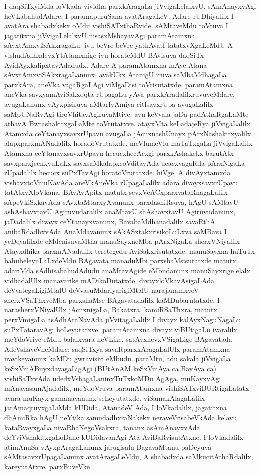 I daqSiTxyiMda loVkada vividha parxkAragaLa jiVvigaLelalxvU, sAmAnayxvAgi heVLa\-bahudAdare, I paramapuruSana avatAragaLeV. Adare rUDhiyalilx I avatAra shabadxkekx oMdu vishiSATxthaRvide. sAMtaveMdu toVruva I jagatitxna jiVvigaLelalxvU nisasxM\-shaya\-vAgi paramAtamxna sAvxtAmxviSAkxragaLu. ivu beVre beVre yathAvatf tatatxvX\-gaLeMdU A vishudAdhxdevxYtAtamxnige ivu horateMdU BAvisuva daqSiTx AvidAyxkalipxta\-vAdadudx. Adare A paramAtamxna mAye Atana sAvxtAmxviSAkxragaLanunx, avakUkx Ata\-nigU iruva saMbaMdhagaLa parxkAra, aneVka vagaRgaLAgi viMgaDisi toVrisutatxde. para\-mAtamxna aneVka savxyamAviSakxqqta rUpagaLu yAva parxkAradalilxruvuveMdare, avu\-gaLanunx vAyxpisiruva aMtarfyAmiya citfsavxrUpa avugaLalilx saMpUNaRvAgi tiroVhita\-vAgiruvaMtive. avu keVvala jaDa padAthaRgaLaMte athavA BwtashakitxgaLaMte toVru\-tatxve. atayxMta keLadajeRya jiVvigaLalilx Atamxda ceYtanayxsavxrUpavu avugaLa jAcnxnashUnayx pArxNashakitxyalilx alapxparxmANadalilx horadoVrutatxde. meVlumeVlu maTaTxgaLa jiVvi\-gaLalilx Atamxna ceYtanayxsavxrUpavu hecucxhecAcxgi parxkAshakekx barutAtx savxparxjecnxyuLaLx savxsaMkalapx\-coVdita\-vAda ucacxvagaRda pArxNigaLa rUpadalilx hecucx suPxTavAgi horatoVrutatxde. hiVge, A divAyxtamxda vishavxtoVmuKavAda aneVkAneVka rUpagaLalilx adara divayxsavxrUpavu tatAtxvX\-loVkana, BAvAvApitx matutx sevxVcACxparxvataRnagaLalilx sApeVkiSxkavAda sAvxtaMtarxyXvanunx parxdashiRsuva, hAgU sAMtavU ashAshavxtavU Agiruvudaralilx anaMtavU shAshavxtavU Agiruvudanunx, jaDadalilx divayx ceYtanayxvanunx, BavabaMdhanadalilx savaRthA anibaRdadhxvAda AnaMdavanunx sAkASxtakxrisikoLuLxva saMBava I yeDeyalilxde eMdenisuvaMtha manuSayx\-neMba pArxNigaLa sherxVNiyalilx Atayxdhika parxmANadalilx teretegedu AviSakxrisutatxde. manuSayxna huTuTx bahubeleyuLaLxdeMdu BAgavata manaduMbi parxshaMsisutatxde matutx adariMda sAdhisabahudAdudu anaMtavAgide eMbudanunx manuSayxrige elalx vidhadalUlx mana\-varike mADikoDutatxde. divayxloVkavAsigaLAda deVvategaLigiMtalU deVvasuMdari\-yari\-giMtalU narajanamxveV sherxVSaThxveMba parxshaMse BAgavatadalilx kaMDubarutatxde. I nara\-sherxVNi\-yalUlx jAcnxnigaLa, Bakatxra, kamiRSaThxra, matutx perxVmigaLa asAdhAraNavAda jiVvitagaLalilx I divayx kalAyxNaguNagaLu suPxTataravAgi hoLeyutatxve. paramAtamxna divayx viBUti\-gaLu ivaralilx meYdoVrive eMdu balalxvara heVLike. satAyxnevxVSigaLige BAgavatada AdeVsha\-veVneMdare: saqSiTxya savaRparxkAragaLalUlx paramAtamxna iravikeyanunx kaMDu gwravisiri eMbudu. paraMtu, adu sakala jiVvigaLa keSxVmABuyxdayagaLigAgi (BUtAnAM keSxVmAya ca BavAya ca) vishiSaTxvAda udedxVshagaLaninxTuTxkoMDu AgAga, muKayx\-vAgi mAnavasamAjadalilx, meYdoVruva paramAtamxna vishiSATxviBURtigaLatatx avara muKayx gamanavanunx seLeyutatxde. viSamakAlagaLalilx jarAmaqtuyxgaLiMda kUDida, AtanadeV Ada, I loVkadalilx, jagatitxna dhAmiRka hAgU neYtika samudadhxraNakekx neraveVrisabeVkAda kelavu kataRvayxgaLa nivaRhaNegoVsakxra, tananx asAmAnayxvAda deYviVshakitxgaLoDane kUDi\-davanAgi Ata AviBaRvisutAtxne. I loVkadalilx atimAnuSa vAyxpAragaLanunx jarugi\-salu BagavaMtanu paDeyuva sAMtasavxrUpagaLanunx avatAragaLeMdu, A shabadxda saMkucitAthaRdalilx, kareyutAtxre. parxBuveVke 